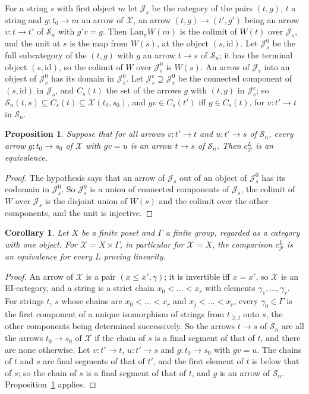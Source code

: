 \documentclass[11pt]{amsart}
\newtheorem{cor}[thm]{Corollary}
\newtheorem{prop}[thm]{Proposition}
\theoremstyle{definition}
\newcommand{\cX}{\mathcal X}
\newcommand{\cP}{\mathcal P}
\newcommand{\cS}{\mathcal S}
\newcommand{\cJ}{\mathcal J}
\newcommand{\id}{\mathrm{id}}
\begin{document}
For a string $s$ with first object $m$ let $\cJ_s$ be the category of
the pairs $(t,g)$, $t$ a string and $g\colon t_0\to m$ an arrow of
$\cX$, an arrow $(t,g)\to(t',g')$ being an arrow $v\colon t\to t'$ of
$\cS_n$ with $g'v=g$. Then $\mathrm{Lan}_\pi W(m)$ is the colimit of
$W(t)$ over $\cJ_s$, and the unit at $s$ is the map from $W(s)$, at the
object $(s,\id)$. Let $\cJ^0_s$ be the full subcategory of the $(t,g)$
with $g$ an arrow $t\to s$ of $\cS_n$; it has the terminal object
$(s,\id)$, so the colimit of $W$ over $\cJ^0_s$ is $W(s)$. An arrow of
$\cJ_s$ into an object of $\cJ^0_s$ has its domain in $\cJ^0_s$. Let
$\cJ^c_s\supseteq\cJ^0_s$ be the connected component of $(s,\id)$ in
$\cJ_s$, and $C_s(t)$ the set of the arrows $g$ with $(t,g)$ in
$\cJ^c_s$; so $\cS_n(t,s)\subseteq C_s(t)\subseteq\cX(t_0,s_0)$, and
$gv\in C_s(t')$ iff $g\in C_s(t)$, for $v\colon t'\to t$ in $\cS_n$.

\begin{prop}\label{prop:T}
Suppose that for all arrows $v\colon t'\to t$ and $u\colon t'\to s$ of
$\cS_n$, every arrow $g\colon t_0\to s_0$ of $\cX$ with $gv=u$ is an
arrow $t\to s$ of $\cS_n$. Then $c^L_\cP$ is an equivalence.
\end{prop}
\begin{proof}
The hypothesis says that an arrow of $\cJ_s$ out of an object of
$\cJ^0_s$ has its codomain in $\cJ^0_s$. So $\cJ^0_s$ is a union of
connected components of $\cJ_s$, the colimit of $W$ over $\cJ_s$ is the
disjoint union of $W(s)$ and the colimit over the other components,
and the unit is injective.
\end{proof}

\begin{cor}\label{cor:product}
Let $X$ be a finite poset and $\Gamma$ a finite group, regarded as a
category with one object. For $\cX=X\times\Gamma$, in particular for
$\cX=X$, the comparison $c^L_\cP$ is an equivalence for every $L$
proving linearity.
\end{cor}
\begin{proof}
An arrow of $\cX$ is a pair $(x\le x',\gamma)$; it is invertible iff
$x=x'$, so $\cX$ is an EI-category, and a string is a strict chain
$x_0<\dots<x_r$ with elements $\gamma_1,\dots,\gamma_r$. For strings
$t$, $s$ whose chains are $x_0<\dots<x_r$ and $x_j<\dots<x_r$, every
$\gamma_0\in\Gamma$ is the first component of a unique isomorphism of
strings from $t_{\ge j}$ onto $s$, the other components being
determined successively. So the arrows $t\to s$ of $\cS_n$ are all the
arrows $t_0\to s_0$ of $\cX$ if the chain of $s$ is a final segment of
that of $t$, and there are none otherwise. Let $v\colon t'\to t$,
$u\colon t'\to s$ and $g\colon t_0\to s_0$ with $gv=u$. The chains of
$t$ and $s$ are final segments of that of $t'$, and the first element
of $t$ is below that of $s$; so the chain of $s$ is a final segment of
that of $t$, and $g$ is an arrow of $\cS_n$. Proposition~\ref{prop:T}
applies.
\end{proof}
\end{document}
